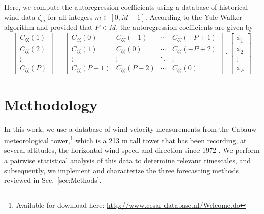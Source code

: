 \documentclass[11pt, oneside]{article}
\newcommand{\secref}[1]{Sec.~\ref{#1}}
\begin{document}
Here, we compute the autoregression coefficients using a database of historical wind data $\zeta_m$ for all integers $m \in [0, M-1]$.
According to the Yule-Walker algorithm and provided that $P < M$, the autoregression coefficients are given by
\begin{equation}
\begin{bmatrix}
C_{\zeta \zeta}(1) \\
C_{\zeta \zeta}(2) \\
\vdots \\
C_{\zeta \zeta}(P)
\end{bmatrix}
=
\begin{bmatrix}
C_{\zeta \zeta}(0) & C_{\zeta \zeta}(-1) & \cdots & C_{\zeta \zeta} (-P+1) \\
C_{\zeta \zeta}(1) & C_{\zeta \zeta}(0) & \cdots & C_{\zeta \zeta} (-P+2) \\
\vdots & \vdots & \ddots & \vdots \\
C_{\zeta \zeta}(P-1) & C_{\zeta \zeta}(P-2) & \cdots & C_{\zeta \zeta}(0)
\end{bmatrix}
\cdot
\begin{bmatrix}
\phi_1 \\
\phi_2 \\
\vdots \\
\phi_P
\end{bmatrix}
\end{equation}

\section{Methodology}\label{sec:Methodology}
In this work, we use a database of wind velocity measurements from the Cabauw meteorological tower,\footnote{Available for download here: \url{http://www.cesar-database.nl/Welcome.do}} which is a 213 m tall tower that has been recording, at several altitudes, the horizontal wind speed and direction since 1972 \citep{VanUldenWieringa1996}. %
We perform a pairwise statistical analysis of this data to determine relevant timescales, and
subsequently, we implement and characterize the three forecasting methods reviewed in \secref{sec:Methods}.
\end{document}
